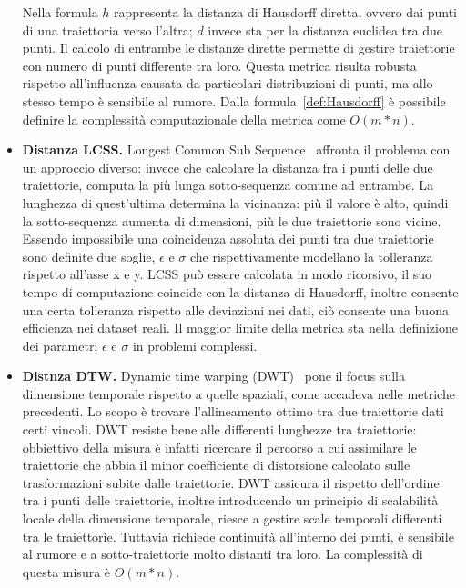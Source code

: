 \begin{itemize}
  Nella formula \(h\) rappresenta la distanza di Hausdorff diretta, ovvero dai punti di una traiettoria verso l'altra; \(d\) invece sta per la distanza euclidea tra due punti.
  Il calcolo di entrambe le distanze dirette permette di gestire traiettorie con numero di punti differente tra loro.
  Questa metrica risulta robusta rispetto all'influenza causata da particolari distribuzioni di punti, ma allo stesso tempo è sensibile
  al rumore. Dalla formula~\cref{def:Hausdorff} è possibile definire la complessità computazionale della metrica come \(O(m*n)\).


  \item \textbf{Distanza LCSS.}
  Longest Common Sub Sequence~\cite{rick2000efficient} affronta il problema con un approccio diverso: invece che calcolare la distanza fra i punti delle due traiettorie, computa la
  più lunga sotto-sequenza comune ad entrambe.
  La lunghezza di quest'ultima determina la vicinanza: più il valore è alto, quindi la sotto-sequenza aumenta di dimensioni, più le due traiettorie sono vicine.
  Essendo impossibile una coincidenza assoluta dei punti tra due traiettorie sono definite due soglie, \(\epsilon \) e \( \sigma \) che rispettivamente
  modellano la tolleranza rispetto all'asse x e y.
  LCSS può essere calcolata in modo ricorsivo, il suo tempo di computazione coincide con la distanza di Hausdorff, inoltre consente una certa tolleranza rispetto
  alle deviazioni nei dati, ciò consente una buona efficienza nei dataset reali.
  Il maggior limite della metrica sta nella definizione dei parametri
  \(\epsilon \) e \( \sigma \) in problemi complessi.

  \item \textbf{Distnza DTW.}
  Dynamic time warping (DWT)~\cite{chen2005robust} pone il focus sulla dimensione temporale rispetto a quelle spaziali, come accadeva nelle metriche precedenti.
  Lo scopo è trovare l'allineamento ottimo tra due traiettorie dati certi vincoli.
  DWT resiste bene alle differenti lunghezze tra traiettorie: obbiettivo della misura è infatti ricercare il percorso a cui assimilare le traiettorie che abbia il minor coefficiente di distorsione
  calcolato sulle trasformazioni subite dalle traiettorie.
  DWT assicura il rispetto dell'ordine tra i punti delle traiettorie, inoltre introducendo un principio di scalabilità locale della dimensione temporale,
  riesce a gestire scale temporali differenti tra le traiettorie.
  Tuttavia richiede continuità all'interno dei punti, è sensibile al rumore e a sotto-traiettorie molto distanti tra loro.
  La complessità di questa misura è \(O(m*n)\).



\end{itemize}
